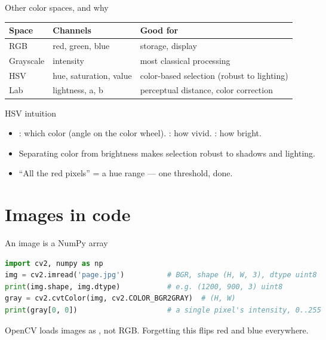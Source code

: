 \documentclass[10pt,aspectratio=169]{beamer}
\begin{document}
\begin{frame}{Other color spaces, and why}
  \begin{center}
  \begin{tabular}{@{}lll@{}}
    \toprule
    \textbf{Space} & \textbf{Channels} & \textbf{Good for} \\
    \midrule
    RGB & red, green, blue & storage, display \\
    Grayscale & intensity & most classical processing \\
    HSV & hue, saturation, value & color-based selection (robust to lighting) \\
    Lab & lightness, a, b & perceptual distance, color correction \\
    \bottomrule
  \end{tabular}
  \end{center}
\end{frame}

\begin{frame}{HSV intuition}
  \begin{itemize}
    \item {}: which color (angle on the color wheel). : how vivid. : how bright.
    \item Separating color from brightness makes selection robust to shadows and lighting.
    \item ``All the red pixels'' = a hue range — one threshold, done.
  \end{itemize}
\end{frame}

\section{Images in code}

\begin{frame}[fragile]{An image is a NumPy array}
\begin{lstlisting}[language=Python]
import cv2, numpy as np
img = cv2.imread('page.jpg')          # BGR, shape (H, W, 3), dtype uint8
print(img.shape, img.dtype)           # e.g. (1200, 900, 3) uint8
gray = cv2.cvtColor(img, cv2.COLOR_BGR2GRAY)  # (H, W)
print(gray[0, 0])                     # a single pixel's intensity, 0..255
\end{lstlisting}
  \begin{badbox}
    OpenCV loads images as , not RGB. Forgetting this flips red and blue everywhere.
  \end{badbox}
\end{frame}
\end{document}
